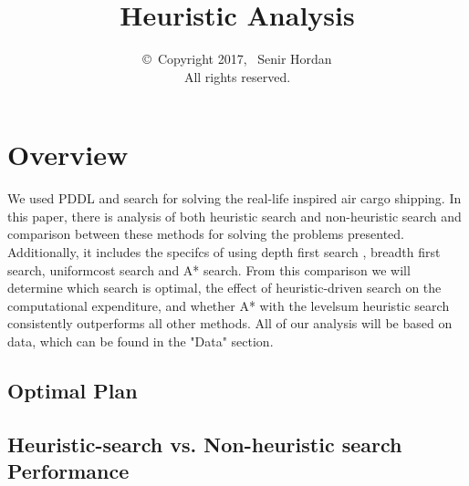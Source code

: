 \documentclass[11pt,a4paper]{report}
\begin{document}
\title{Heuristic Analysis}
\author{\copyright~Copyright 2017, \ Senir Hordan\\
   All rights reserved.}
\maketitle


\section*{Overview}
We used PDDL and search for solving the real-life inspired air cargo shipping. In this paper, there is analysis of both heuristic search and non-heuristic search and comparison between these methods for solving the problems presented. Additionally, it includes the specifcs of using depth first search , breadth first search, uniformcost search and A* search. From this comparison we will determine which search is optimal, the effect of heuristic-driven search on the computational expenditure, and whether A* with the levelsum heuristic search consistently outperforms all other methods. All of our analysis will be based on data, which can be found in the "Data" section.
\subsection*{ Optimal Plan}
\subsection*{ Heuristic-search vs. Non-heuristic search Performance}
\end{document}
